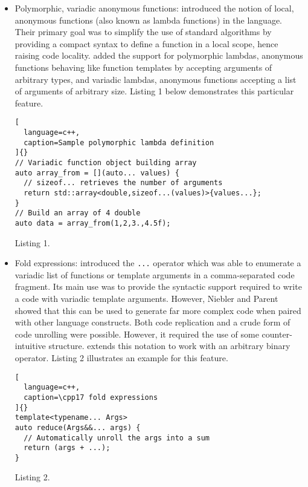 \documentclass[../../main.tex]{subfiles}
\begin{document}
\begin{itemize}
\item Polymorphic, variadic anonymous functions: 
introduced the notion of local, anonymous functions
(also known as lambda functions) in the language.
Their primary goal was to simplify the use of standard
algorithms by providing a compact syntax to define a
function in a local scope, hence raising code locality.
 added the support for polymorphic lambdas, \ie
anonymous functions behaving like function templates
by accepting arguments of arbitrary types, and variadic
lambdas, \ie anonymous functions accepting a list of
arguments of arbitrary size. Listing 1 below demonstrates
this particular feature.

\begin{lstlisting}[
  language=c++,
  caption=Sample polymorphic lambda definition
]{}
// Variadic function object building array
auto array_from = [](auto... values) {
  // sizeof... retrieves the number of arguments
  return std::array<double,sizeof...(values)>{values...};
}
// Build an array of 4 double
auto data = array_from(1,2,3.,4.5f);
\end{lstlisting}
Listing 1.

\item Fold expressions:  introduced the \lstinline{...} operator
which was able to enumerate a variadic list of functions
or template arguments in a comma-separated code
fragment. Its main use was to provide the syntactic
support required to write a code with variadic template
arguments. However, Niebler and Parent showed that
this can be used to generate far more complex code
when paired with other language constructs. Both
code replication and a crude form of code unrolling
were possible. However, it required the use of some
counter-intuitive structure.  extends this notation
to work with an arbitrary binary operator. Listing 2
illustrates an example for this feature.

\begin{lstlisting}[
  language=c++,
  caption=\cpp17 fold expressions
]{}
template<typename... Args>
auto reduce(Args&&... args) {
  // Automatically unroll the args into a sum
  return (args + ...);
}
\end{lstlisting}
Listing 2.


\end{itemize}
\end{document}
